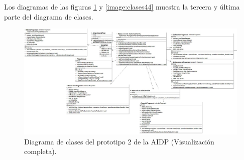 Los diagramas de las figuras \ref{image:clases33} y \ref{image:clases44} muestra la tercera y última parte del diagrama de clases.

\FloatBarrier
\begin{figure}[htbp!]
		\centering
			\includegraphics[width=1.1 \textwidth]{imagenes/aidp_clases/home}
		\caption{Diagrama de clases del prototipo 2 de la AIDP (Visualización completa).}
		\label{image:clases33}
\end{figure}
\FloatBarrier

